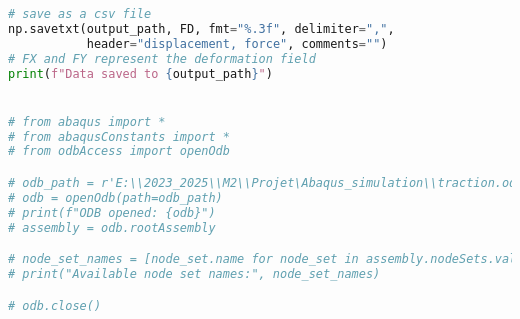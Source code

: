 \documentclass[12pt,a4paper]{article}
\begin{document}
\begin{lstlisting}[language=Python, caption={Extraction force-déplacement numérique }]
# save as a csv file
np.savetxt(output_path, FD, fmt="%.3f", delimiter=",", 
           header="displacement, force", comments="")
# FX and FY represent the deformation field
print(f"Data saved to {output_path}")


# from abaqus import *
# from abaqusConstants import *
# from odbAccess import openOdb

# odb_path = r'E:\\2023_2025\\M2\\Projet\Abaqus_simulation\\traction.odb'
# odb = openOdb(path=odb_path)
# print(f"ODB opened: {odb}")
# assembly = odb.rootAssembly

# node_set_names = [node_set.name for node_set in assembly.nodeSets.values()]
# print("Available node set names:", node_set_names)

# odb.close()
\end{lstlisting}
\end{document}
